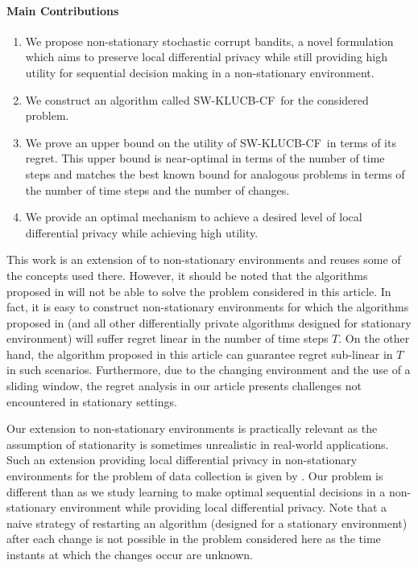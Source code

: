 \documentclass[letterpaper]{article} %
\newcommand{\SWKLUCBCF}{\textsc{SW-KLUCB-CF}}
\begin{document}
\paragraph{Main Contributions}
\begin{enumerate}
\item We propose non-stationary stochastic corrupt bandits, a novel formulation which aims to preserve local differential privacy while still providing high utility for sequential decision making in a non-stationary environment.
\item We construct an algorithm called \SWKLUCBCF \ for the considered problem.
\item We prove an upper bound on the utility of \SWKLUCBCF \ in terms of its regret. This upper bound is near-optimal in terms of the number of time steps and matches the best known bound for analogous problems in terms of the number of time steps and the number of changes.
\item We provide an optimal mechanism to achieve a desired level of local differential privacy while achieving high utility.
\end{enumerate}

This work is an extension of \citet{pmlr-v83-gajane18a} to non-stationary environments and reuses some of the concepts used there. However, it should be noted that the algorithms proposed in \citet{pmlr-v83-gajane18a} will not be able to solve the problem considered in this article. In fact, it is easy to construct non-stationary environments for which the algorithms proposed in \citet{pmlr-v83-gajane18a} (and all other differentially private algorithms designed for stationary environment) will suffer regret linear in the number of time steps $T$. On the other hand, the algorithm proposed in this article can guarantee regret sub-linear in $T$ in such scenarios. Furthermore, due to the changing environment and the use of a sliding window, the regret analysis in our article presents challenges not encountered in stationary settings.

Our extension to non-stationary environments is practically relevant as the assumption of stationarity is sometimes unrealistic in real-world applications. Such an extension providing local differential privacy in non-stationary environments for the problem of data collection is given by \citet{NEURIPS2018_a0161022}. %
Our problem is different than \citet{NEURIPS2018_a0161022} as we study learning to make optimal sequential decisions in a non-stationary environment while providing local differential privacy.
Note that a naive strategy of restarting an algorithm (designed for a stationary environment) after each change is not possible in the problem considered here as the time instants at which the changes occur are unknown.
\end{document}
